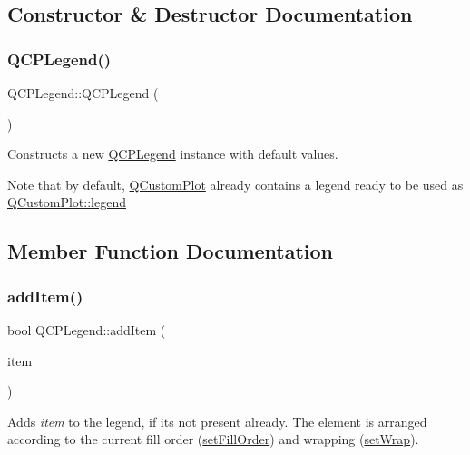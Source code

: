 \subsection{Constructor \& Destructor Documentation}
\mbox{\label{class_q_c_p_legend_a0001a456989bd07ea378883651fabd72}} 
\subsubsection{\texorpdfstring{Q\+C\+P\+Legend()}{QCPLegend()}}
{\footnotesize\ttfamily Q\+C\+P\+Legend\+::\+Q\+C\+P\+Legend (\begin{DoxyParamCaption}{ }\end{DoxyParamCaption})\hspace{0.3cm}{\ttfamily [explicit]}}

Constructs a new \mbox{\hyperlink{class_q_c_p_legend}{Q\+C\+P\+Legend}} instance with default values.

Note that by default, \mbox{\hyperlink{class_q_custom_plot}{Q\+Custom\+Plot}} already contains a legend ready to be used as \mbox{\hyperlink{class_q_custom_plot_a4eadcd237dc6a09938b68b16877fa6af}{Q\+Custom\+Plot\+::legend}} 

\subsection{Member Function Documentation}
\mbox{\label{class_q_c_p_legend_a3ab274de52d2951faea45a6d975e6b3f}} 
\subsubsection{\texorpdfstring{add\+Item()}{addItem()}}
{\footnotesize\ttfamily bool Q\+C\+P\+Legend\+::add\+Item (\begin{DoxyParamCaption}\item[{\mbox{\hyperlink{class_q_c_p_abstract_legend_item}{Q\+C\+P\+Abstract\+Legend\+Item}} $\ast$}]{item }\end{DoxyParamCaption})}

Adds {\itshape item} to the legend, if it\textquotesingle{}s not present already. The element is arranged according to the current fill order (\mbox{\hyperlink{class_q_c_p_layout_grid_affc2f3cfd22f28698c5b29b960d2a391}{set\+Fill\+Order}}) and wrapping (\mbox{\hyperlink{class_q_c_p_layout_grid_ab36af18d77e4428386d02970382ee598}{set\+Wrap}}).

